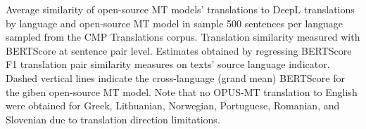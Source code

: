 Average similarity of open-source MT models' translations to DeepL translations by language and open-source MT model in sample 500 sentences per language sampled from the CMP Translations corpus. Translation similarity measured with BERTScore at sentence pair level. Estimates obtained by regressing BERTScore F1 translation pair similarity measures on texts' source language indicator. Dashed vertical lines indicate the cross-language (grand mean) BERTScore for the giben open-source MT model. Note that no OPUS-MT translation to English were obtained for Greek, Lithuanian, Norwegian, Portuguese, Romanian, and Slovenian due to translation direction limitations. \label{fig:bertscore_similarity_averages_by_language_and_mt_model}

